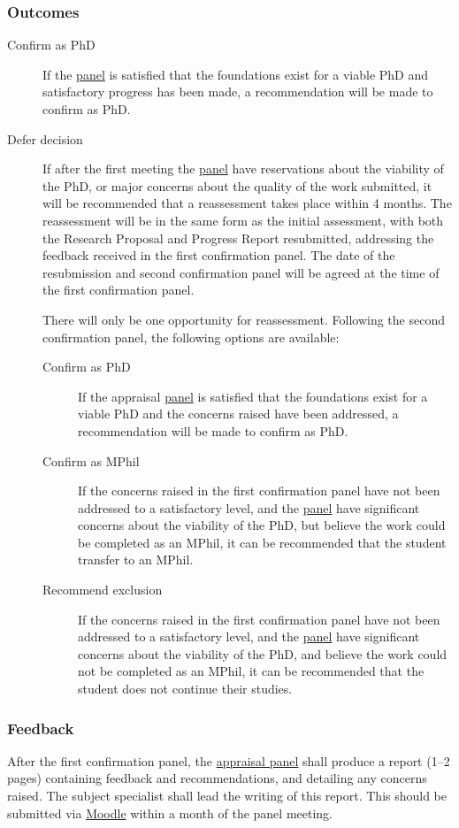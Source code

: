\documentclass[12pt,a4paper]{article}
\begin{document}
\subsubsection{Outcomes}

\begin{description}
	\item[Confirm as PhD] If the \hyperref[sec:panel]{panel} is satisfied that the foundations exist for a viable PhD and satisfactory progress has been made, a recommendation will be made to confirm as PhD.
	\item[Defer decision] If after the first meeting the \hyperref[sec:panel]{panel} have reservations about the viability of the PhD, or major concerns about the quality of the work submitted, it will be recommended that a reassessment takes place within 4 months. The reassessment will be in the same form as the initial assessment, with both the Research Proposal and Progress Report resubmitted, addressing the feedback received in the first confirmation panel. The date of the resubmission and second confirmation panel will be agreed at the time of the first confirmation panel.
	
	There will only be one opportunity for reassessment. Following the second confirmation panel, the following options are available:
	\begin{description}
		\item[Confirm as PhD] If the appraisal \hyperref[sec:panel]{panel} is satisfied that the foundations exist for a viable PhD and the concerns raised have been addressed, a recommendation will be made to confirm as PhD.
		\item[Confirm as MPhil] If the concerns raised in the first confirmation panel have not been addressed to a satisfactory level, and the \hyperref[sec:panel]{panel} have significant concerns about the viability of the PhD, but believe the work could be completed as an MPhil, it can be recommended that the student transfer to an MPhil.
		\item[Recommend exclusion] If the concerns raised in the first confirmation panel have not been addressed to a satisfactory level, and the \hyperref[sec:panel]{panel} have significant concerns about the viability of the PhD, and believe the work could not be completed as an MPhil, it can be recommended that the student does not continue their studies.
	\end{description}
\end{description}

\subsubsection{Feedback}
After the first confirmation panel, the \hyperref[sec:panel]{appraisal panel} shall produce a report (1--2 pages) containing feedback and recommendations, and detailing any concerns raised. The subject specialist shall lead the writing of this report. This should be submitted via \href{https://modules.lancaster.ac.uk/course/view.php?id=7050}{Moodle} within a month of the panel meeting.
\end{document}
